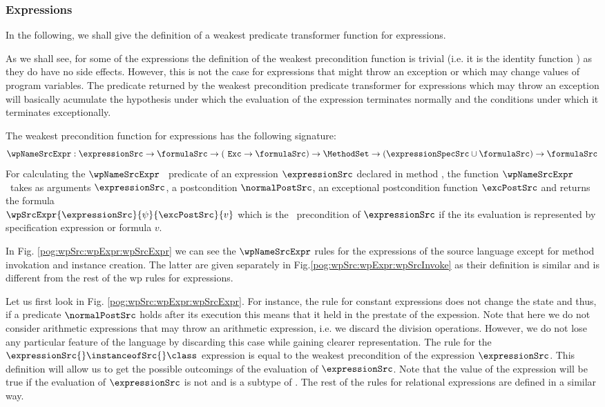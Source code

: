 \subsubsection{Expressions}\label{pog:wpSrc:wpExpr}
In the following, we shall give the definition of a weakest
predicate transformer function for expressions. 


As we shall see,  for some of the expressions   
the definition of the weakest precondition function is trivial (i.e. it is the identity function )
 as they do have  no side effects.
 However, this is not the case for expressions that might throw an exception or which may change values of program variables.
 The predicate returned by the weakest precondition predicate transformer for expressions which may throw an exception 
will basically acumulate the hypothesis under which the evaluation 
of the expression terminates normally and the  conditions under which it  terminates exceptionally.


The weakest precondition function for expressions has the following signature:
$$ \wpNameSrcExpr : \expressionSrc \rightarrow \formulaSrc \rightarrow ( \mbox{ \rm \texttt{Exc}} \rightarrow  \formulaSrc ) \rightarrow  
\MethodSet \rightarrow   (\expressionSpecSrc \cup \formulaSrc)  \rightarrow  \formulaSrc $$
For calculating the  $\wpNameSrcExpr$ \ predicate  of  an expression $\expressionSrc$ declared in method \methodd,
 the function $\wpNameSrcExpr$ \ takes as arguments  $\expressionSrc$, a postcondition $\normalPostSrc$, an exceptional postcondition 
function $\excPostSrc$  and 
  returns the    formula \\
$\wpSrcExpr{\expressionSrc}{\psi}{\excPostSrc}{ v }$ which is the \wpName \ precondition of $\expressionSrc$ 
if the its evaluation is represented by  specification expression or formula $v$.


In Fig. \ref{pog:wpSrc:wpExpr:wpSrcExpr} we can see the $\wpNameSrcExpr$ rules for the expressions of the source language except for method invokation 
and instance creation. The latter are given separately in Fig.\ref{pog:wpSrc:wpExpr:wpSrcInvoke} as their definition is similar and is different from 
the rest of the wp rules for expressions.

Let us first look in Fig. \ref{pog:wpSrc:wpExpr:wpSrcExpr}.
For instance, the rule for constant expressions does not change the state and thus, if a predicate $ \normalPostSrc$ holds
 after its execution this means that it held in the prestate of the expession. 
Note that here we do not consider arithmetic expressions that may throw
an arithmetic expression, i.e. we discard the division operations. However,  
we do not lose any particular feature of the language by discarding this case 
while gaining clearer representation. 
The rule for the $\expressionSrc{} \instanceofSrc{}  \class $ expression is equal to the weakest precondition 
of the expression $\expressionSrc$.  This definition will allow us to get the possible outcomings  of the evaluation 
of $\expressionSrc$. Note that the value of the \instanceofSrc{}  expression will be true if  
the evaluation of $\expressionSrc$ is not \Mynull{} and is a subtype of \class{}.
The rest of the rules for  relational expressions are defined in a similar way.
 

